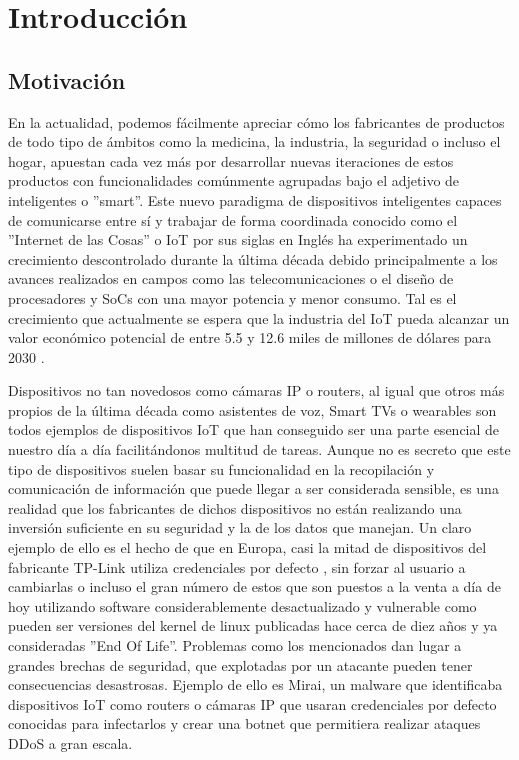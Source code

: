 \chapter{Introducción}
\label{introduccion}

\section{Motivación}
En la actualidad, podemos fácilmente apreciar cómo los fabricantes de productos de todo tipo de
ámbitos como la medicina, la industria, la seguridad o incluso el hogar, apuestan cada vez 
más por desarrollar nuevas iteraciones de estos productos con funcionalidades comúnmente agrupadas bajo el 
adjetivo de inteligentes o ''smart''. Este nuevo paradigma de dispositivos inteligentes capaces de 
comunicarse entre sí y trabajar de forma coordinada conocido como el ''Internet de las Cosas'' o IoT por 
sus siglas en Inglés ha experimentado un crecimiento descontrolado durante la última década debido 
principalmente a los avances realizados en campos como las telecomunicaciones o el diseño de procesadores y
SoCs con una mayor potencia y menor consumo. Tal es el crecimiento que actualmente se espera que la industria del
IoT pueda alcanzar un valor económico potencial de entre 5.5 y 12.6 miles de millones de dólares para
2030 \cite{McKinsey}.\bigskip

Dispositivos no tan novedosos como cámaras IP o routers, al igual que otros más 
propios de la última década como asistentes de voz, Smart TVs o wearables son todos ejemplos 
de dispositivos IoT que han conseguido ser una parte esencial de nuestro día a día facilitándonos
multitud de tareas. Aunque no es secreto que este tipo de dispositivos suelen basar su funcionalidad en 
la recopilación y comunicación de información que puede llegar a ser considerada sensible, es una realidad 
que los fabricantes de dichos dispositivos no están realizando una inversión suficiente en su seguridad y 
la de los datos que manejan. Un claro ejemplo de ello es el hecho de que en Europa, casi la mitad 
de dispositivos del fabricante TP-Link utiliza credenciales por defecto \cite{Deepak}, sin forzar al usuario 
a cambiarlas o incluso el gran número de estos que son puestos a la venta a día de hoy utilizando software 
considerablemente desactualizado y vulnerable como pueden ser versiones del kernel de linux publicadas hace cerca de 
diez años y ya consideradas ''End Of Life''. Problemas como los mencionados dan lugar a grandes brechas de
seguridad, que explotadas por un atacante pueden tener consecuencias desastrosas. Ejemplo de ello es 
Mirai\cite{mirai}, un malware que identificaba dispositivos IoT como routers o cámaras IP que usaran credenciales 
por defecto conocidas para infectarlos y crear una botnet que permitiera realizar ataques DDoS a gran escala.\bigskip

